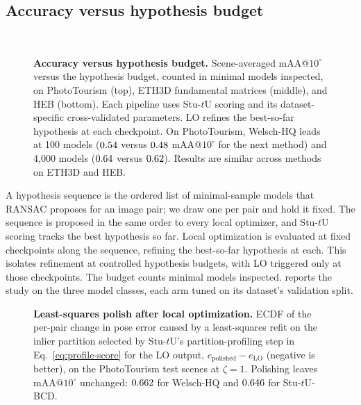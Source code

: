 \documentclass[runningheads]{llncs}
\newcommand{\stuU}{Stu-$t$U}          %
\begin{document}
\subsection{Accuracy versus hypothesis budget}
\label{sec:exp-budget}
\begin{figure}[!t]
	\centering
	\\[3pt]
	\caption{\textbf{Accuracy versus hypothesis budget.}
		Scene-averaged mAA@$10^\circ$ versus the hypothesis budget, counted in minimal models inspected, on PhotoTourism (top), ETH3D fundamental matrices (middle), and HEB (bottom).
		Each pipeline uses \stuU{} scoring and its dataset-specific
		cross-validated parameters. LO refines the best-so-far hypothesis at
		each checkpoint. On PhotoTourism, Welsch-HQ leads at 100 models
		($0.54$ versus $0.48$ mAA@$10^\circ$ for the next method) and 4,000 models
		($0.64$ versus $0.62$). Results are similar across methods on ETH3D and HEB.}
	\label{fig:sample-budget}
\end{figure}
A hypothesis sequence is the ordered list of minimal-sam\-ple models that
RANSAC proposes for an image pair; we draw one per pair and hold it fixed.
The sequence is proposed in the same order to every local optimizer, and
\stuU{} scoring tracks the best hypothesis so far. Local optimization is
evaluated at fixed checkpoints along the sequence, refining the
best-so-far hypothesis at each. This isolates refinement at controlled
hypothesis budgets, with LO triggered only at those checkpoints.
The budget counts minimal models inspected.
 reports the study on the three model classes, each arm tuned on its dataset's validation split.

\begin{figure}[t]
	\centering
	
	\caption{\textbf{Least-squares polish after local optimization.}
	ECDF of the per-pair change in pose error caused by a least-squares
	refit on the inlier partition selected by \stuU{}'s partition-profiling
	step in
	Eq.~\eqref{eq:profile-score} for the LO output,
	$e_{\text{polished}}-e_{\text{LO}}$ (negative is better), on the \PTTestScenes{}
	PhotoTourism test scenes at $\zeta=1$. Polishing leaves
	mAA@$10^\circ$ unchanged: $0.662$ for Welsch-HQ and $0.646$ for
	\stuU{}-BCD.}
	\label{fig:polish}
\end{figure}
\end{document}
